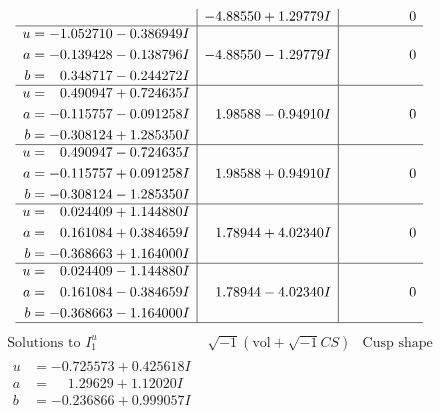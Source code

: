 \documentclass[1p]{elsarticle_modified}
\theoremstyle{definition}
\newcommand{\I}{\sqrt{-1}}
\begin{document}
$$\begin{array}{c|c|c}
 & -4.88550 + 1.29779 I & \phantom{-0.000000 } 0 \\ \hline\begin{aligned}
u &= -1.052710 - 0.386949 I \\
a &= -0.139428 - 0.138796 I \\
b &= \phantom{-}0.348717 - 0.244272 I\end{aligned}
 & -4.88550 - 1.29779 I & \phantom{-0.000000 } 0 \\ \hline\begin{aligned}
u &= \phantom{-}0.490947 + 0.724635 I \\
a &= -0.115757 - 0.091258 I \\
b &= -0.308124 + 1.285350 I\end{aligned}
 & \phantom{-}1.98588 - 0.94910 I & \phantom{-0.000000 } 0 \\ \hline\begin{aligned}
u &= \phantom{-}0.490947 - 0.724635 I \\
a &= -0.115757 + 0.091258 I \\
b &= -0.308124 - 1.285350 I\end{aligned}
 & \phantom{-}1.98588 + 0.94910 I & \phantom{-0.000000 } 0 \\ \hline\begin{aligned}
u &= \phantom{-}0.024409 + 1.144880 I \\
a &= \phantom{-}0.161084 + 0.384659 I \\
b &= -0.368663 + 1.164000 I\end{aligned}
 & \phantom{-}1.78944 + 4.02340 I & \phantom{-0.000000 } 0 \\ \hline\begin{aligned}
u &= \phantom{-}0.024409 - 1.144880 I \\
a &= \phantom{-}0.161084 - 0.384659 I \\
b &= -0.368663 - 1.164000 I\end{aligned}
 & \phantom{-}1.78944 - 4.02340 I & \phantom{-0.000000 } 0\\
 \hline 
 \end{array}$$\newpage$$\begin{array}{c|c|c}  
\text{Solutions to }I^u_{1}& \I (\text{vol} + \sqrt{-1}CS) & \text{Cusp shape}\\
 \hline 
\begin{aligned}
u &= -0.725573 + 0.425618 I \\
a &= \phantom{-}1.29629 + 1.12020 I \\
b &= -0.236866 + 0.999057 I\end{aligned}

\end{array}$$
\end{document}
